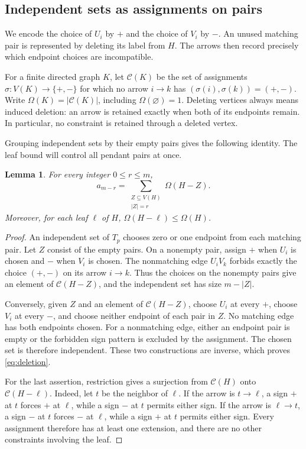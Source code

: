 \documentclass[11pt,a4paper]{article}
\newtheorem{lemma}[theorem]{Lemma}
\theoremstyle{remark}
\numberwithin{equation}{section}
\begin{document}
\subsection{Independent sets as assignments on pairs}\label{sec:assignments}

We encode the choice of $U_i$ by $+$ and the choice of $V_i$ by $-$.
An unused matching pair is represented by deleting its label from $H$.
The arrows then record precisely which endpoint choices are incompatible.

For a finite directed graph $K$, let $\mathcal C(K)$ be
the set of assignments $\sigma:V(K)\to\{+,-\}$ for which no arrow
$i\to k$ has $(\sigma(i),\sigma(k))=(+,-)$. Write
$\Omega(K)=|\mathcal C(K)|$, including $\Omega(\varnothing)=1$.
Deleting vertices always means induced deletion: an arrow is retained
exactly when both of its endpoints remain. In particular, no constraint
is retained through a deleted vertex.

Grouping independent sets by their empty pairs gives the following
identity. The leaf bound will control all pendant pairs at once.

\begin{lemma}
\label{lem:deletion}
For every integer $0\leq r\leq m$,
\begin{equation}
 a_{m-r}=\sum_{\substack{Z\subseteq V(H)\\|Z|=r}}\Omega(H-Z).
 \label{eq:deletion}
\end{equation}
Moreover, for each leaf $\ell$ of $H$,
$\Omega(H-\ell)\leq\Omega(H)$.
\end{lemma}

\begin{proof}
An independent set of $T_p$ chooses zero or one endpoint from each
matching pair. Let $Z$ consist of the empty pairs. On a nonempty pair,
assign $+$ when $U_i$ is chosen and $-$ when $V_i$ is chosen. The
nonmatching edge $U_iV_k$ forbids exactly the choice $(+,-)$ on its
arrow $i\to k$. Thus the choices on the nonempty pairs give an
element of $\mathcal C(H-Z)$, and the independent set has size
$m-|Z|$.

Conversely, given $Z$ and an element of $\mathcal C(H-Z)$, choose
$U_i$ at every $+$, choose $V_i$ at every $-$, and choose neither
endpoint of each pair in $Z$. No matching edge has both endpoints
chosen. For a nonmatching edge, either an endpoint pair is empty or
the forbidden sign pattern is excluded by the assignment. The chosen
set is therefore independent. These two constructions are inverse,
which proves \eqref{eq:deletion}.

For the last assertion, restriction gives a surjection from
$\mathcal C(H)$ onto $\mathcal C(H-\ell)$. Indeed, let $t$ be the
neighbor of $\ell$. If the arrow is $t\to\ell$, a sign $+$ at $t$
forces $+$ at $\ell$, while a sign $-$ at $t$ permits either sign.
If the arrow is $\ell\to t$, a sign $-$ at $t$ forces $-$ at
$\ell$, while a sign $+$ at $t$ permits either sign. Every assignment
therefore has at least one extension, and there are no other
constraints involving the leaf.
\end{proof}
\end{document}
